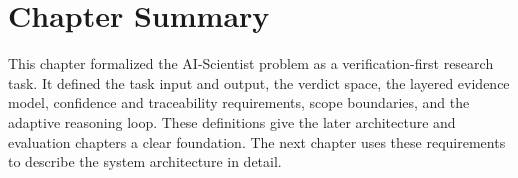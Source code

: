 \section{Chapter Summary}

This chapter formalized the AI-Scientist problem as a verification-first research task. It defined the task input and output, the verdict space, the layered evidence model, confidence and traceability requirements, scope boundaries, and the adaptive reasoning loop. These definitions give the later architecture and evaluation chapters a clear foundation. The next chapter uses these requirements to describe the system architecture in detail.

